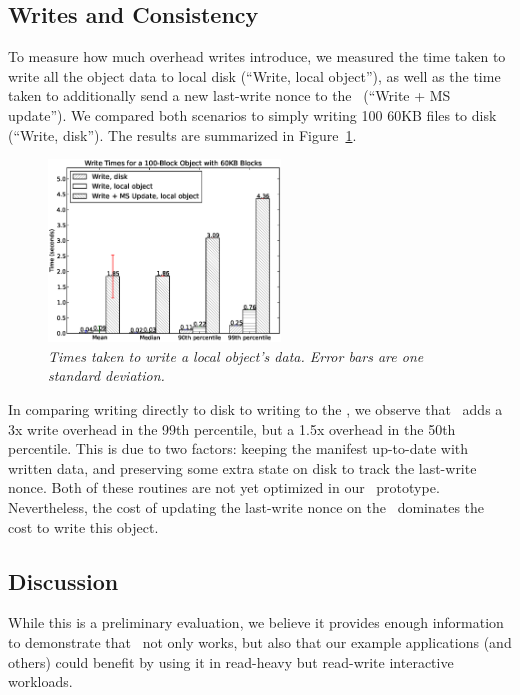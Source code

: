 \subsection{Writes and Consistency}

To measure how much overhead writes introduce, we measured the time 
taken to write all the object data to local disk (``Write, local object''), as well as the time
taken to additionally send a new last-write nonce to the \MS\ (``Write + MS update'').
We compared both scenarios to simply writing
100 60KB files to disk (``Write, disk'').  The results are summarized in 
Figure~\ref{fig:write_performance}.


\begin{figure}[h!]
\centerline{\includegraphics[width=0.55\textwidth]{figures/write_performance}}
\caption{\it Times taken to write a local object's data.  Error bars are one standard deviation.}
\label{fig:write_performance}
\end{figure}

In comparing writing directly to disk to writing to the \SG, we observe that \Syndicate\
adds a 3x write overhead in the 99th percentile, but a 1.5x overhead in the 50th
percentile.  This is due to two factors:  keeping the manifest up-to-date with 
written data, and preserving some extra state on disk to track the last-write nonce.
Both of these routines are not yet optimized in our \SG\ prototype.  Nevertheless,
the cost of updating the last-write nonce on the \MS\ dominates the cost to write 
this object.

\subsection{Discussion}

While this is a preliminary evaluation, we believe it provides enough
information to demonstrate that \Syndicate\ not only works, but also
that our example applications (and others) could benefit by using it
in read-heavy but read-write interactive workloads.

